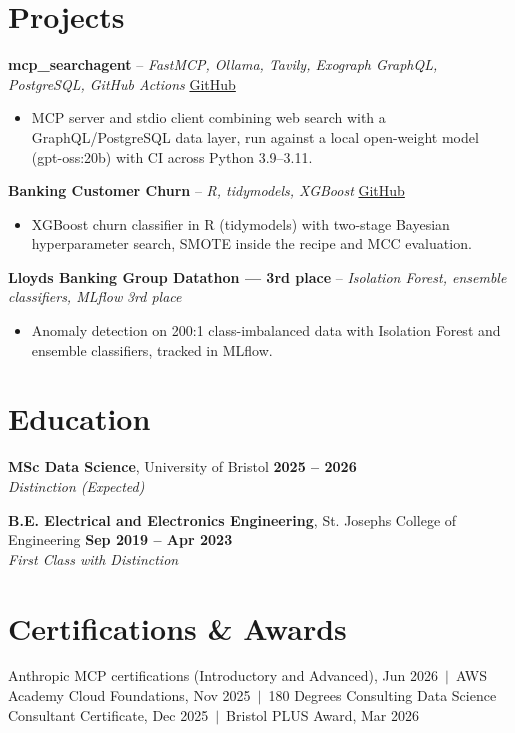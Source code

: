 \documentclass[a4paper,11pt]{article}
\begin{document}
\section{Projects}
\noindent\textbf{mcp\_searchagent} -- \textit{FastMCP, Ollama, Tavily, Exograph GraphQL, PostgreSQL, GitHub Actions} \hfill \href{https://github.com/Thiruvel-AP/mcp_searchagent}{GitHub}
\begin{itemize}
  \item MCP server and stdio client combining web search with a GraphQL/PostgreSQL data layer, run against a local open-weight model (gpt-oss:20b) with CI across Python 3.9–3.11.
\end{itemize}
\vspace{3pt}
\noindent\textbf{Banking Customer Churn} -- \textit{R, tidymodels, XGBoost} \hfill \href{https://github.com/Thiruvel-AP/Banking-Customer-Churn-Prediction}{GitHub}
\begin{itemize}
  \item XGBoost churn classifier in R (tidymodels) with two-stage Bayesian hyperparameter search, SMOTE inside the recipe and MCC evaluation.
\end{itemize}
\vspace{3pt}
\noindent\textbf{Lloyd\textquotesingle{}s Banking Group Datathon — 3rd place} -- \textit{Isolation Forest, ensemble classifiers, MLflow} \hfill \textit{3rd place}
\begin{itemize}
  \item Anomaly detection on 200:1 class-imbalanced data with Isolation Forest and ensemble classifiers, tracked in MLflow.
\end{itemize}

\section{Education}
\textbf{MSc Data Science}, University of Bristol \hfill \textbf{2025 – 2026}\\ \textit{Distinction (Expected)}\par
\vspace{3pt}
\textbf{B.E. Electrical and Electronics Engineering}, St. Joseph\textquotesingle{}s College of Engineering \hfill \textbf{Sep 2019 – Apr 2023}\\ \textit{First Class with Distinction}\par

\section{Certifications \& Awards}
Anthropic MCP certifications (Introductory and Advanced), Jun 2026 \,$|$\, AWS Academy Cloud Foundations, Nov 2025 \,$|$\, 180 Degrees Consulting Data Science Consultant Certificate, Dec 2025 \,$|$\, Bristol PLUS Award, Mar 2026
\end{document}
